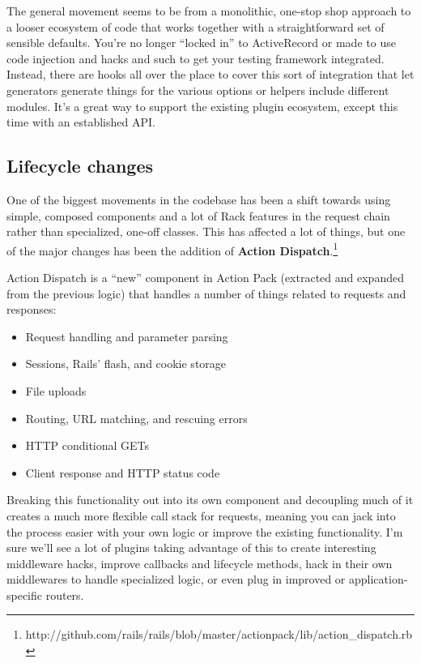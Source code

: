 \documentclass{book}
\begin{document}
The general movement seems to be from a monolithic, one-stop shop approach to a looser ecosystem of code that works together with a straightforward set of sensible defaults. You'{}re no longer ``{}locked in''{} to ActiveRecord or made to use code injection and hacks and such to get your testing framework integrated. Instead, there are hooks all over the place to cover this sort of integration that let generators generate things for the various options or helpers include different modules. It'{}s a great way to support the existing plugin ecosystem, except this time with an established API.

\hypertarget{lifecycle_changes}{}\subsection*{{Lifecycle changes}}\label{lifecycle_changes}

One of the biggest movements in the codebase has been a shift towards using simple, composed components and a lot of Rack features in the request chain rather than specialized, one-off classes. This has affected a lot of things, but one of the major changes has been the addition of \textbf{Action Dispatch}.\footnote{http://github.com/rails/rails/blob/master/actionpack/lib/action\_dispatch.rb} 



Action Dispatch is a ``{}new''{} component in Action Pack (extracted and expanded from the previous logic) that handles a number of things related to requests and responses:

\begin{itemize}%
\item Request handling and parameter parsing
\item Sessions, Rails'{} flash, and cookie storage
\item File uploads
\item Routing, URL matching, and rescuing errors
\item HTTP conditional GETs
\item Client response and HTTP status code

\end{itemize}
Breaking this functionality out into its own component and decoupling much of it creates a much more flexible call stack for requests, meaning you can jack into the process easier with your own logic or improve the existing functionality. I'{}m sure we'{}ll see a lot of plugins taking advantage of this to create interesting middleware hacks, improve callbacks and lifecycle methods, hack in their own middlewares to handle specialized logic, or even plug in improved or application-specific routers.
\end{document}
